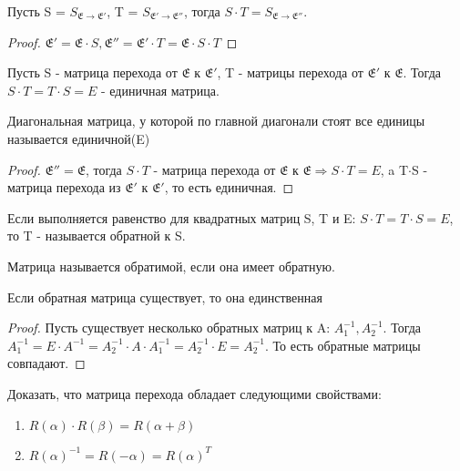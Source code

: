 \begin{proposition}
Пусть S = \(S_{\mathfrak{E}\to\mathfrak{E'}}\), T = \(S_{\mathfrak{E'}\to\mathfrak{E''}}\), тогда \(S\cdot T = S_{\mathfrak{E}\to\mathfrak{E''}}\).
\end{proposition}
\begin{proof}
\(\mathfrak{E'} = \mathfrak{E}\cdot S, \mathfrak{E''} = \mathfrak{E'}\cdot T = \mathfrak{E}\cdot S\cdot T\)
\end{proof}
\begin{proposition}
Пусть S - матрица перехода от \(\mathfrak{E}\) к \(\mathfrak{E'}\), T - матрицы перехода от \(\mathfrak{E'}\) к \(\mathfrak{E}\). Тогда \(S\cdot T = T\cdot S = E\) - единичная матрица.
\end{proposition}
\begin{definition}
Диагональная матрица, у которой по главной диагонали стоят все единицы называется единичной(E)
\end{definition}
\begin{proof}	
	\(\mathfrak{E''} = \mathfrak{E}\), тогда \(S\cdot T\) - матрица перехода от \(\mathfrak{E}\) к \(\mathfrak{E}\Longrightarrow S\cdot T = E\), a T$\cdot$S - матрица перехода из \(\mathfrak{E'}\) к \(\mathfrak{E'}\), то есть единичная.
\end{proof}
\begin{definition}
Если выполняется равенство для квадратных матриц S, T и E: \(S\cdot T = T\cdot S = E\), то T - называется обратной к S.
\end{definition}
\begin{definition}
Матрица называется обратимой, если она имеет обратную.
\end{definition}
\begin{proposition}
Если обратная матрица существует, то она единственная
\end{proposition}
\begin{proof}
Пусть существует несколько обратных матриц к A: \(A_1^{-1}, A_2^{-1}\). Тогда \(A_1^{-1} = E\cdot A^{-1} = A_2^{-1}\cdot A\cdot A_1^{-1} = A_2^{-1}\cdot E = A_2^{-1}\). То есть обратные матрицы совпадают.
\end{proof}
\begin{exercise}
Доказать, что матрица перехода обладает следующими свойствами:
\begin{enumerate}
	\item \(R(\alpha)\cdot R(\beta) = R(\alpha+\beta)\)
	\item \(R(\alpha)^{-1} = R(-\alpha)=R(\alpha)^T\)
\end{enumerate}
\end{exercise}
